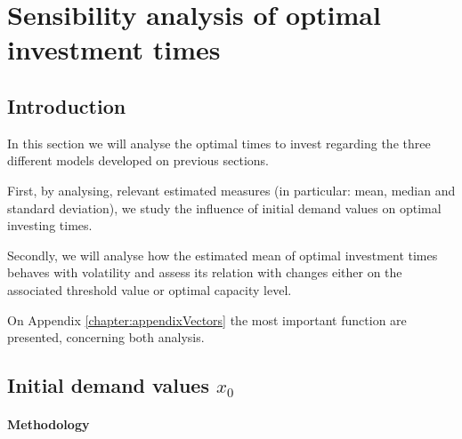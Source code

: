 \chapter{Sensibility analysis of optimal investment times}
\label{chapter:stoptime}



\section{Introduction}
\label{section:stoptime_intro}

In this section we will analyse the optimal times to invest regarding the three different models developed on previous sections.


First, by analysing, relevant estimated measures (in particular: mean, median and standard deviation), we study the influence of initial demand values on optimal investing times.

Secondly, we will analyse how the estimated mean of optimal investment times behaves with volatility and assess its relation with changes  either on the associated threshold value or optimal capacity level.

On Appendix \ref{chapter:appendixVectors} the most important function are presented, concerning both analysis.

\section{Initial demand values $x_0$}
\label{section:x0}

\subsubsection{Methodology}










































